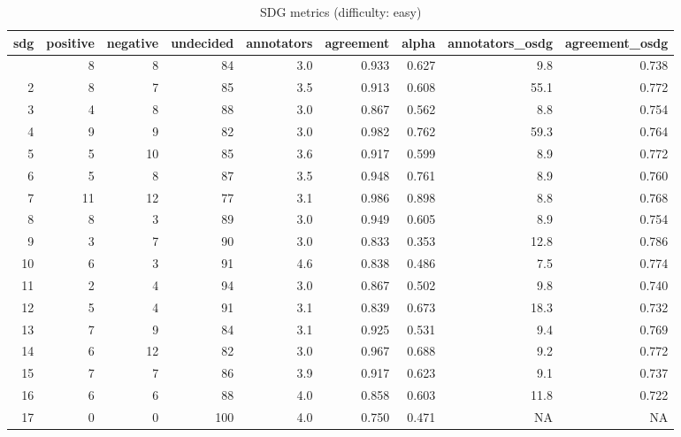 \begin{table}[t]
\caption*{
{\large SDG metrics (difficulty: easy)}
} 
\fontsize{12.0pt}{14.4pt}\selectfont
\begin{tabular*}{\linewidth}{@{\extracolsep{\fill}}rrrrrrrrr}
\toprule
sdg & positive & negative & undecided & annotators & agreement & alpha & annotators\_osdg & agreement\_osdg \\ 
\midrule\addlinespace[2.5pt]
1 & 8 & 8 & 84 & 3.0 & 0.933 & 0.627 & 9.8 & 0.738 \\ 
2 & 8 & 7 & 85 & 3.5 & 0.913 & 0.608 & 55.1 & 0.772 \\ 
3 & 4 & 8 & 88 & 3.0 & 0.867 & 0.562 & 8.8 & 0.754 \\ 
4 & 9 & 9 & 82 & 3.0 & 0.982 & 0.762 & 59.3 & 0.764 \\ 
5 & 5 & 10 & 85 & 3.6 & 0.917 & 0.599 & 8.9 & 0.772 \\ 
6 & 5 & 8 & 87 & 3.5 & 0.948 & 0.761 & 8.9 & 0.760 \\ 
7 & 11 & 12 & 77 & 3.1 & 0.986 & 0.898 & 8.8 & 0.768 \\ 
8 & 8 & 3 & 89 & 3.0 & 0.949 & 0.605 & 8.9 & 0.754 \\ 
9 & 3 & 7 & 90 & 3.0 & 0.833 & 0.353 & 12.8 & 0.786 \\ 
10 & 6 & 3 & 91 & 4.6 & 0.838 & 0.486 & 7.5 & 0.774 \\ 
11 & 2 & 4 & 94 & 3.0 & 0.867 & 0.502 & 9.8 & 0.740 \\ 
12 & 5 & 4 & 91 & 3.1 & 0.839 & 0.673 & 18.3 & 0.732 \\ 
13 & 7 & 9 & 84 & 3.1 & 0.925 & 0.531 & 9.4 & 0.769 \\ 
14 & 6 & 12 & 82 & 3.0 & 0.967 & 0.688 & 9.2 & 0.772 \\ 
15 & 7 & 7 & 86 & 3.9 & 0.917 & 0.623 & 9.1 & 0.737 \\ 
16 & 6 & 6 & 88 & 4.0 & 0.858 & 0.603 & 11.8 & 0.722 \\ 
17 & 0 & 0 & 100 & 4.0 & 0.750 & 0.471 & NA & NA \\ 
\bottomrule
\end{tabular*}
\end{table}

